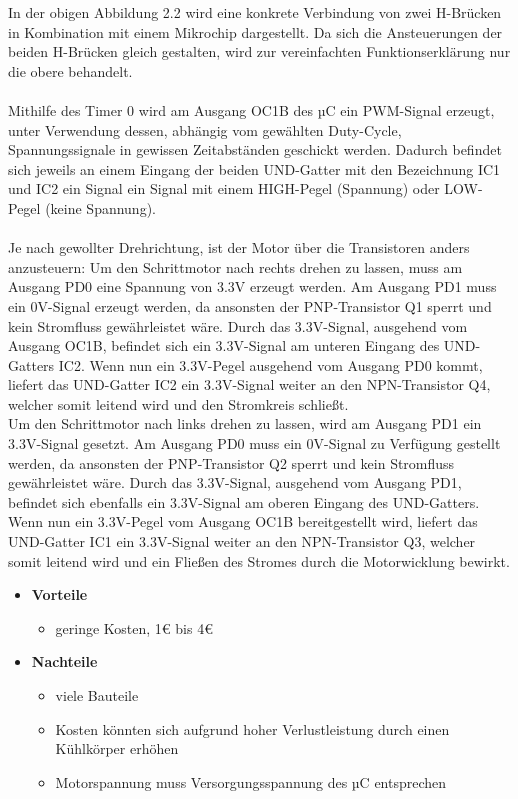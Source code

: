 In der obigen Abbildung 2.2 wird eine konkrete Verbindung von zwei H-Brücken in Kombination mit einem Mikrochip dargestellt.
Da sich die Ansteuerungen der beiden H-Brücken gleich gestalten, wird zur vereinfachten Funktionserklärung nur die obere behandelt. \\\\
Mithilfe des Timer 0 wird am Ausgang OC1B des \acs{µC} ein PWM-Signal erzeugt, unter Verwendung dessen,
abhängig vom gewählten Duty-Cycle, Spannungssignale in gewissen Zeitabständen geschickt werden.
Dadurch befindet sich jeweils an einem Eingang der beiden UND-Gatter mit den Bezeichnung IC1 und IC2 ein Signal ein Signal mit einem HIGH-Pegel (Spannung) oder LOW-Pegel (keine Spannung). \\\\
Je nach gewollter Drehrichtung, ist der Motor über die Transistoren anders anzusteuern:
Um den Schrittmotor nach rechts drehen zu lassen, muss am Ausgang PD0 eine Spannung von 3.3V erzeugt werden.
Am Ausgang PD1 muss ein 0V-Signal erzeugt werden, da ansonsten der PNP-Transistor Q1 sperrt und kein Stromfluss gewährleistet wäre.
Durch das 3.3V-Signal, ausgehend vom Ausgang OC1B, befindet sich ein 3.3V-Signal am unteren Eingang des UND-Gatters IC2.
Wenn nun ein 3.3V-Pegel ausgehend vom Ausgang PD0 kommt, liefert das UND-Gatter IC2 ein 3.3V-Signal weiter an den NPN-Transistor Q4, welcher somit leitend wird und den Stromkreis schließt. \\
Um den Schrittmotor nach links drehen zu lassen, wird am Ausgang PD1 ein 3.3V-Signal gesetzt.
Am Ausgang PD0 muss ein 0V-Signal zu Verfügung gestellt werden, da ansonsten der PNP-Transistor Q2 sperrt und kein Stromfluss gewährleistet wäre.
Durch das 3.3V-Signal, ausgehend vom Ausgang PD1, befindet sich ebenfalls ein 3.3V-Signal am oberen Eingang des UND-Gatters.
Wenn nun ein 3.3V-Pegel vom Ausgang OC1B bereitgestellt wird, liefert das UND-Gatter IC1 ein 3.3V-Signal weiter an den NPN-Transistor Q3, welcher somit leitend wird und
ein Fließen des Stromes durch die Motorwicklung bewirkt.

\begin{itemize}
    \item \textbf{Vorteile}
    \begin{itemize}
        \item geringe Kosten, 1€ bis 4€
    \end{itemize}
    \item \textbf{Nachteile}
    \begin{itemize}
        \item viele Bauteile
        \item Kosten könnten sich aufgrund hoher Verlustleistung durch einen Kühlkörper erhöhen
        \item Motorspannung muss Versorgungsspannung des µC entsprechen
    \end{itemize}
\end{itemize}

